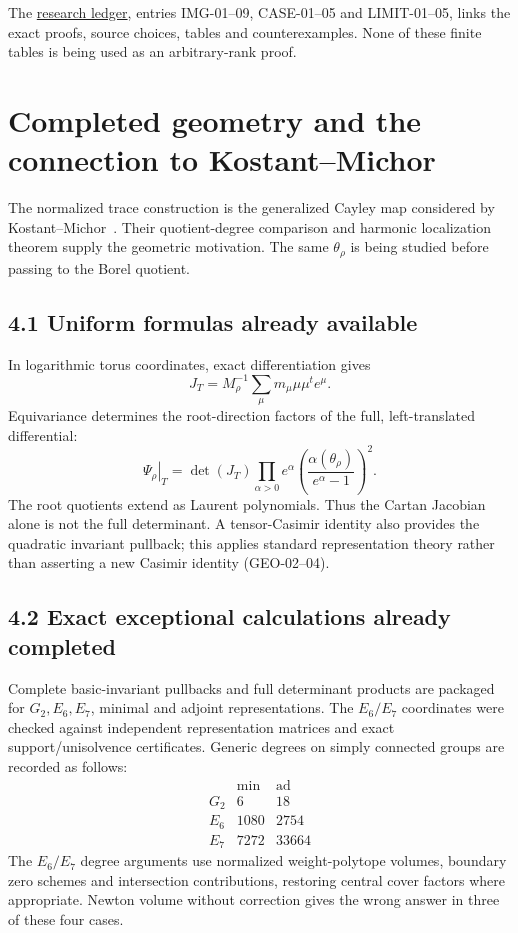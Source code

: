 \documentclass[11pt,letterpaper]{article}
\newcommand{\ad}{\mathrm{ad}}
\newcommand{\minrep}{\mathrm{min}}
\newcommand{\repo}{https://github.com/sean-rogers-t/Sage-programs/blob/e9fcb7f3b7d28bea9c248abab1f01d8de28250aa/}
\newcommand{\record}[2]{\href{\repo#1}{#2}}
\begin{document}
The \record{borel/RESEARCH_LEDGER.md}{research ledger}, entries IMG-01--09,
CASE-01--05 and LIMIT-01--05, links the exact proofs, source choices,
tables and counterexamples. None of these finite tables is being used
as an arbitrary-rank proof.

\newpage
\section{Completed geometry and the connection to Kostant--Michor}
The normalized trace construction is the generalized Cayley map considered
by Kostant--Michor~\cite{KM}. Their quotient-degree comparison and harmonic
localization theorem supply the geometric motivation. The same
\(\theta_\rho\) is being studied before passing to the Borel quotient.

\subsection*{4.1 Uniform formulas already available}
In logarithmic torus coordinates, exact differentiation gives
\[
 J_T=M_\rho^{-1}\sum_\mu m_\mu\mu\mu^t e^\mu.
\]
Equivariance determines the root-direction factors of the full,
left-translated differential:
\[
 \boxed{\left.\Psi_\rho\right|_T
 =\det(J_T)\prod_{\alpha>0}
 e^\alpha\left(\frac{\alpha(\theta_\rho)}{e^\alpha-1}\right)^2.}
\]
The root quotients extend as Laurent polynomials. Thus the Cartan Jacobian
alone is not the full determinant. A tensor-Casimir identity also provides
the quadratic invariant pullback; this applies standard representation
theory rather than asserting a new Casimir identity (GEO-02--04).

\subsection*{4.2 Exact exceptional calculations already completed}
Complete basic-invariant pullbacks and full determinant products are
packaged for \(G_2,E_6,E_7\), minimal and adjoint representations. The
\(E_6/E_7\) coordinates were checked against independent representation
matrices and exact support/unisolvence certificates. Generic degrees
on simply connected groups are recorded as follows:
\[
\begin{array}{c|rr}
 &\minrep&\ad\\ \hline
G_2&6&18\\
E_6&1080&2754\\
E_7&7272&33664
\end{array}
\]
The \(E_6/E_7\) degree arguments use normalized weight-polytope volumes,
boundary zero schemes and intersection contributions, restoring central
cover factors where appropriate. Newton volume without correction gives
the wrong answer in three of these four cases.
\end{document}
